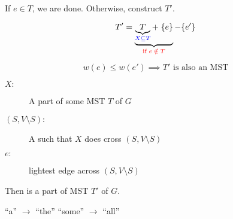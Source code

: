 \begin{frame}{}
  \begin{center}
    {}
  \end{center}

  \pause

  \pause
  \begin{center}
    If $e \in T$, we are done. \pause Otherwise, construct $T'$.
  \end{center}

  \pause
  \[
    T' = \underbrace{\underbrace{T}_{\textcolor{blue}{X \subseteq T}} +\; \{e\}}_{\textcolor{red}{\text{if } e \;\notin\; T}} - \{e'\}
  \]

  \pause
  \[
    w(e) \le w(e') \implies T' \text{ is also an MST}
  \]
\end{frame}

\begin{frame}{}
  \begin{theorem}
    \begin{description}
      \item[$X:$] A part of some MST $T$ of $G$
      \item[$(S, V \setminus S):$] A  such that $X$ does  cross $(S, V \setminus S)$
    ­  \item[$e:$]  lightest edge across $(S, V \setminus S)$
    \end{description}

    \begin{center}
      {Then  is a part of  MST $T'$ of $G$.}
    \end{center}
  \end{theorem}

  \pause
  \vspace{0.30cm}
  \begin{center}
    {``a'' $\to$ ``the'' \red{$\implies$} ``some'' $\to$ ``all''}
  \end{center}
\end{frame}

%
%
%
